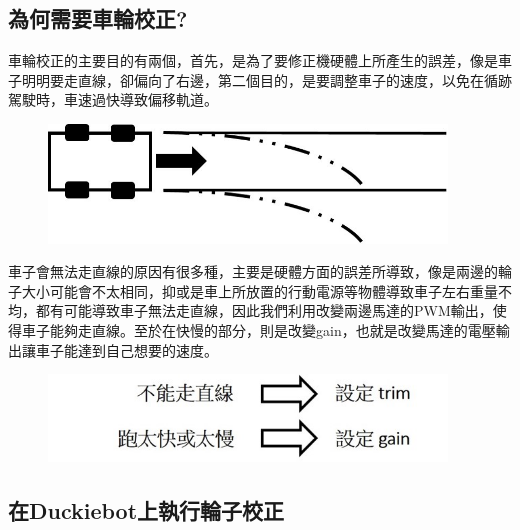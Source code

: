 \documentclass{article}
\begin{document}
\subsection{為何需要車輪校正?}

車輪校正的主要目的有兩個，首先，是為了要修正機硬體上所產生的誤差，像是車子明明要走直線，卻偏向了右邊，第二個目的，是要調整車子的速度，以免在循跡駕駛時，車速過快導致偏移軌道。
\\
\begin{figure}[htp]
    \begin{center}
        \includegraphics[width=300pt]{pic/圖片22.jpg}
    \end{center}
\end{figure}
車子會無法走直線的原因有很多種，主要是硬體方面的誤差所導致，像是兩邊的輪子大小可能會不太相同，抑或是車上所放置的行動電源等物體導致車子左右重量不均，都有可能導致車子無法走直線，因此我們利用改變兩邊馬達的PWM輸出，使得車子能夠走直線。至於在快慢的部分，則是改變gain，也就是改變馬達的電壓輸出讓車子能達到自己想要的速度。
\\
\begin{figure}[htp]
    \begin{center}
        \includegraphics[width=300pt]{pic/圖片23.jpg}
    \end{center}
\end{figure}

\subsection{在Duckiebot上執行輪子校正}
\end{document}
